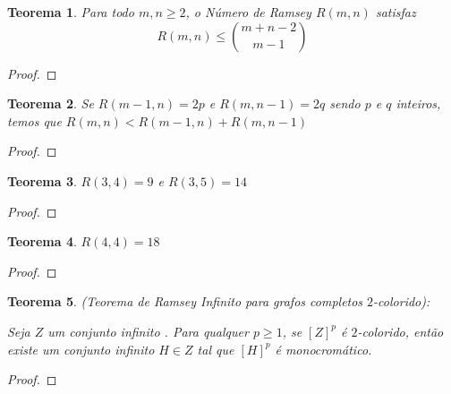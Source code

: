 \documentclass{article}
\newtheorem{teor}{Teorema}[section]
\begin{document}
\begin{teor}
    Para todo $m,n \geq 2$, o Número de Ramsey  $R(m, n)$ satisfaz
    \[R(m, n) \leq \binom{m+n-2}{m-1}\]
\end{teor}

\begin{proof}

\end{proof}


\begin{teor}
    Se $R(m-1, n) = 2p$ e $R(m, n-1) = 2q$ sendo $p$ e $q$ inteiros, temos que $R(m, n) < R(m-1, n) + R(m, n-1)$
\end{teor}

\begin{proof}

\end{proof}


\begin{teor}
    $R(3, 4) = 9$ e $R(3, 5) = 14$
\end{teor}

\begin{proof}

\end{proof}


\begin{teor}
    $R(4, 4) = 18$
\end{teor}

\begin{proof}

\end{proof}


\begin{teor}
    (Teorema de Ramsey Infinito para grafos completos $2$\emph{-colorido}):

    Seja $Z$ um conjunto infinito . Para qualquer $p \ge 1$, se $[Z]^p$ é $2$\emph{-colorido}, então existe um conjunto infinito $H \in Z$ tal que $[H]^p$ é monocromático.
\end{teor}

\begin{proof}

\end{proof}
\end{document}
